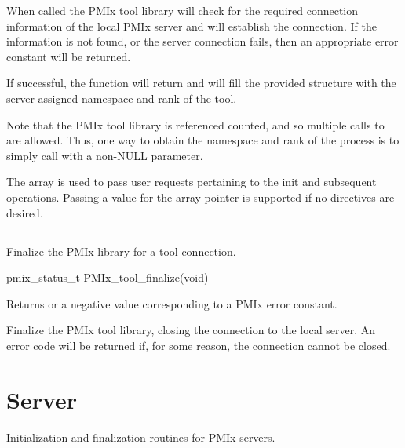 When called the PMIx tool library will check for the required connection information of the local PMIx server and will establish the connection.
If the information is not found, or the server connection fails, then an appropriate error constant will be returned.

If successful, the function will return  and will fill the provided structure with the server-assigned namespace and rank of the tool.

Note that the PMIx tool library is referenced counted, and so multiple calls to  are allowed.
Thus, one way to obtain the namespace and rank of the process is to simply call  with a non-NULL parameter.

The  array is used to pass user requests pertaining to the init and subsequent operations.
Passing a  value for the array pointer is supported if no directives are desired.


\subsection{}

\summary

Finalize the \ac{PMIx} library for a tool connection.

\format

\cspecificstart
\begin{codepar}
pmix_status_t
PMIx_tool_finalize(void)
\end{codepar}
\cspecificend

Returns  or a negative value corresponding to a PMIx error constant.

\descr

Finalize the PMIx tool library, closing the connection to the local server.
An error code will be returned if, for some reason, the connection cannot be closed.


\section{Server}
\label{chap:api_init:server}

Initialization and finalization routines for \ac{PMIx} servers.

\subsection{}

